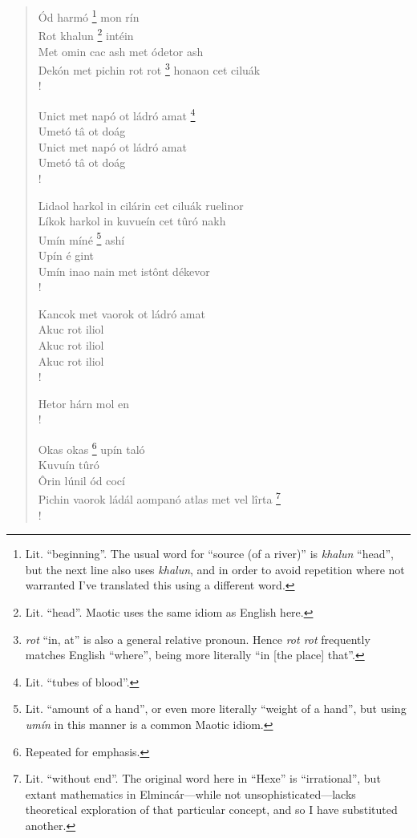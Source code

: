 \documentclass{article}
\let\oldthefootnote\thefootnote
\newcommand\oocfootnote[2][DarkGreen]{\renewcommand\thefootnote{\color{#1}\oldthefootnote}%
  \footnote{\color{#1}#2}%
  \renewcommand{\thefootnote}{\oldthefootnote}}
\begin{document}
\begin{verse}
Ód harmó\oocfootnote{Lit. ``beginning''. The usual word for ``source (of a river)'' is \emph{khalun} ``head'', but the next line also uses \emph{khalun}, and in order to avoid repetition where not warranted I've translated this using a different word.} mon rín \\
Rot khalun\oocfootnote{Lit. ``head''. Maotic uses the same idiom as English here.} intéin \\
Met omin cac ash met ódetor ash \\

Dekón met pichin rot rot\oocfootnote{\emph{rot} ``in, at'' is also a general relative pronoun. Hence \emph{rot rot} frequently matches English ``where'', being more literally ``in [the place] that''.} honaon cet ciluák \\!

Unict met napó ot ládró amat\oocfootnote{Lit. ``tubes of blood''.} \\
Umetó tâ ot doág \\
Unict met napó ot ládró amat \\
Umetó tâ ot doág \\!

Lidaol harkol in cilárin cet ciluák ruelinor \\
Líkok harkol in kuvueín cet tûró nakh \\
Umín míné\oocfootnote{Lit. ``amount of a hand'', or even more literally ``weight of a hand'', but using \emph{umín} in this manner is a common Maotic idiom.} ashí \\
Upín é gint \\
Umín inao nain met istônt dékevor \\!

Kancok met vaorok ot ládró amat \\
Akuc rot iliol \\
Akuc rot iliol \\
Akuc rot iliol \\!

Hetor hárn mol en \\!

Okas okas\oocfootnote{Repeated for emphasis.} upín taló \\
Kuvuín tûró \\
Ôrin lúnil ód cocí \\
Pichin vaorok ládál aompanó atlas met vel lîrta\oocfootnote{Lit. ``without end''. The original word here in ``Hexe'' is ``irrational'', but extant mathematics in Elmincár—while not unsophisticated—lacks theoretical exploration of that particular concept, and so I have substituted another.} \\!


\end{verse}
\end{document}
